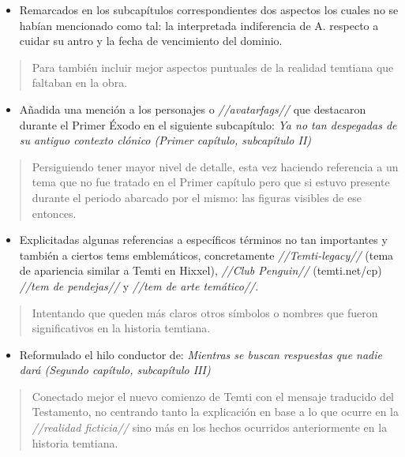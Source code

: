 \documentclass[
]{book}
\providecommand{\tightlist}{%
  \setlength{\itemsep}{0pt}\setlength{\parskip}{0pt}}
\begin{document}
\begin{itemize}
\tightlist
\item
  Remarcados en los subcapítulos correspondientes dos aspectos los cuales no se habían mencionado como tal: la interpretada indiferencia de A. respecto a cuidar su antro y la fecha de vencimiento del dominio.
\end{itemize}

\begin{quote}
Para también incluir mejor aspectos puntuales de la realidad temtiana que faltaban en la obra.
\end{quote}

\begin{itemize}
\tightlist
\item
  Añadida una mención a los personajes o \emph{//avatarfags//} que destacaron durante el Primer Éxodo en el siguiente subcapítulo: \emph{Ya no tan despegadas de su antiguo contexto clónico (Primer capítulo, subcapítulo II)}
\end{itemize}

\begin{quote}
Persiguiendo tener mayor nivel de detalle, esta vez haciendo referencia a un tema que no fue tratado en el Primer capítulo pero que si estuvo presente durante el periodo abarcado por el mismo: las figuras visibles de ese entonces.
\end{quote}

\begin{itemize}
\tightlist
\item
  Explicitadas algunas referencias a específicos términos no tan importantes y también a ciertos tems emblemáticos, concretamente \emph{//Temti-legacy//} (tema de apariencia similar a Temti en Hixxel), \emph{//Club Penguin//} (temti.net/cp) \emph{//tem de pendejas//} y \emph{//tem de arte temático//}.
\end{itemize}

\begin{quote}
Intentando que queden más claros otros símbolos o nombres que fueron significativos en la historia temtiana.
\end{quote}

\begin{itemize}
\tightlist
\item
  Reformulado el hilo conductor de: \emph{Mientras se buscan respuestas que nadie dará (Segundo capítulo, subcapítulo III)}
\end{itemize}

\begin{quote}
Conectado mejor el nuevo comienzo de Temti con el mensaje traducido del Testamento, no centrando tanto la explicación en base a lo que ocurre en la \emph{//realidad ficticia//} sino más en los hechos ocurridos anteriormente en la historia temtiana.
\end{quote}
\end{document}
